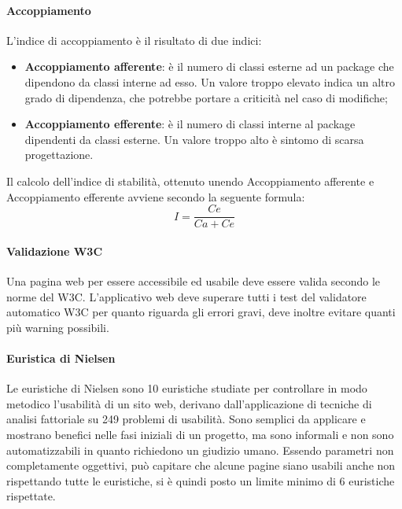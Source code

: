 \documentclass[12pt,a4paper,titlepage]{article}
\begin{document}
			\paragraph{Accoppiamento}
			L'indice di accoppiamento è il risultato di due indici:
			\begin{itemize}
				\item \textbf{Accoppiamento afferente}: è il numero di classi esterne ad un package che dipendono da classi interne ad esso. Un valore troppo elevato indica un altro grado di dipendenza, che potrebbe portare a criticità nel caso di modifiche;
				\item \textbf{Accoppiamento efferente}: è il numero di classi interne al package dipendenti da classi esterne. Un valore troppo alto è sintomo di scarsa progettazione.
			\end{itemize}			
			Il calcolo dell'indice di stabilità, ottenuto unendo Accoppiamento afferente e Accoppiamento efferente avviene secondo la seguente formula:
			\[I=\frac{Ce}{Ca+Ce}\]
			
			\paragraph{Validazione W3C}
			Una pagina web per essere accessibile ed usabile deve essere valida secondo le norme del W3C. L'applicativo web deve superare tutti i test del validatore automatico W3C per quanto riguarda gli errori gravi, deve inoltre evitare quanti più warning possibili.\\

			\paragraph{Euristica di Nielsen}
			Le euristiche di Nielsen sono 10 euristiche studiate per controllare in modo metodico l'usabilità di un sito web, derivano dall'applicazione di tecniche di analisi fattoriale su 249 problemi di usabilità. Sono semplici da applicare e mostrano benefici nelle fasi iniziali di un progetto, ma sono informali e non sono automatizzabili in quanto richiedono un giudizio umano. Essendo parametri non completamente oggettivi, può capitare che alcune pagine siano usabili anche non rispettando tutte le euristiche, si è quindi posto un limite minimo di 6 euristiche rispettate.\\
\end{document}
